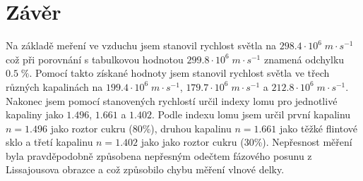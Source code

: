 \documentclass{article}
\begin{document}
\section{Závěr}
Na základě meření ve vzduchu jsem stanovil rychlost světla na \(298.4\cdot10^{6}\;m\cdot s^{-1}\) což při porovnání s tabulkovou hodnotou \(299.8\cdot10^{6}\;m\cdot s^{-1}\) znamená odchylku \(0.5\;\%\).
Pomocí takto získané hodnoty jsem stanovil rychlost světla ve třech různých kapalinách na \(199.4\cdot10^{6}\;m\cdot s^{-1}\), \(179.7\cdot10^{6}\;m\cdot s^{-1}\) a \(212.8\cdot10^{6}\;m\cdot s^{-1}\).
Nakonec jsem pomocí stanovených rychlostí určil indexy lomu pro jednotlivé kapaliny jako \(1.496\), \(1.661\) a \(1.402\). 
Podle indexu lomu jsem určil první kapalinu \(n=1.496\) jako roztor cukru (80\%), druhou kapalinu \(n=1.661\) jako těžké flintové sklo a třetí kapalinu \(n=1.402\) jako jako roztor cukru (30\%).
Nepřesnost měření byla pravděpodobně způsobena nepřesným odečtem fázového posunu z Lissajousova obrazce a což způsobilo chybu měření vlnové delky.
\end{document}
